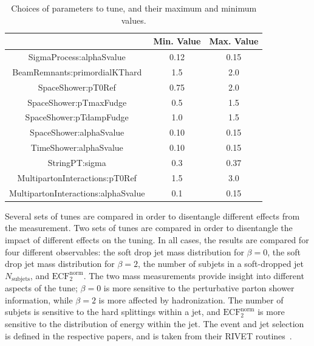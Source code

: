 \begin{table}[ht!]
\caption{Choices of parameters to tune, and their maximum and minimum values.}
\centering\begin{tabular}{ | c | | c | c | } \hline
                                     & Min. Value   & Max. Value    \\ \hline
SigmaProcess:alphaSvalue             &  0.12        & 0.15    \\ \hline
BeamRemnants:primordialKThard        &  1.5         & 2.0     \\ \hline
SpaceShower:pT0Ref                   &  0.75        & 2.0     \\ \hline
SpaceShower:pTmaxFudge               &  0.5         & 1.5     \\ \hline
SpaceShower:pTdampFudge              &  1.0         & 1.5     \\ \hline
SpaceShower:alphaSvalue              &  0.10        & 0.15    \\ \hline
TimeShower:alphaSvalue               &  0.10        & 0.15    \\ \hline
StringPT:sigma                       &  0.3         & 0.37    \\ \hline
MultipartonInteractions:pT0Ref       &  1.5         & 3.0     \\ \hline
MultipartonInteractions:alphaSvalue  &  0.1         & 0.15    \\ \hline
\end{tabular}
\label{tab:parameterSpace}
\end{table}

Several sets of tunes are compared in order to disentangle different effects from the measurement. 
Two sets of tunes are compared in order to disentangle the impact of different effects on the tuning.
In all cases, the results are compared for four different observables:
the soft drop jet mass distribution for $\beta=0$, the soft drop jet mass distribution for $\beta=2$, 
the number of subjets in a soft-dropped jet $N_{\mathrm{subjets}}$, and $\mathrm{ECF}_2^{\mathrm{norm}}$.
The two mass measurements provide insight into different aspects of the tune; $\beta=0$ is more sensitive to the perturbative parton shower information, 
while $\beta=2$ is more affected by hadronization. The number of subjets is sensitive to the hard splittings within a jet, and $\mathrm{ECF}_2^{\mathrm{norm}}$ is more sensitive to the 
distribution of energy within the jet. The event and jet selection is defined in the respective papers, and is taken from their RIVET routines~\cite{Buckley:2010ar}.

